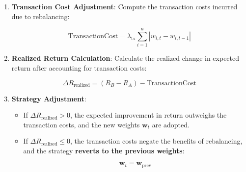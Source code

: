 \begin{enumerate}
    \item \textbf{Transaction Cost Adjustment}: Compute the transaction costs incurred due to rebalancing:

    \[
    \text{TransactionCost} = \lambda_{\text{tx}} \sum_{i=1}^n |w_{i, t} - w_{i, t-1}|
    \]

    \item \textbf{Realized Return Calculation}: Calculate the realized change in expected return after accounting for transaction costs:

    \[
    \Delta R_{\text{realized}} = (R_B - R_A) - \text{TransactionCost}
    \]

    \item \textbf{Strategy Adjustment}:
    \begin{itemize}
        \item If \( \Delta R_{\text{realized}} > 0 \), the expected improvement in return outweighs the transaction costs, and the new weights \( \mathbf{w}_t \) are adopted.
        \item If \( \Delta R_{\text{realized}} \leq 0 \), the transaction costs negate the benefits of rebalancing, and the strategy \textbf{reverts to the previous weights}:

        \[
        \mathbf{w}_t = \mathbf{w}_{\text{prev}}
        \]
    \end{itemize}
\end{enumerate}

